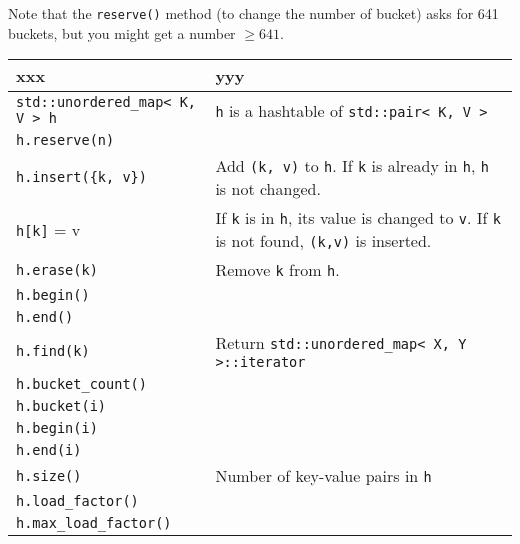 Note that the \verb!reserve()! method (to change the number of
bucket) asks for 641 buckets, but you might get a number $\geq 641$.






{\footnotesize
\begin{tabular}{|p{}|p{}|}
  \hline
  xxx  & yyy
  \\
  \hline \hline
  \texttt{std::unordered\_map< K, V > h} & \texttt{h} is a hashtable of \texttt{std::pair< K, V >} \\ \hline 
  \texttt{h.reserve(n)}                &                                                           \\ \hline 
  \texttt{h.insert(\{k, v\})}          & Add \texttt{(k, v)} to \texttt{h}. If \verb!k! is already in \verb!h!, \verb!h! is not changed. \\ \hline
  \texttt{h[k]} = v                    & If \verb!k! is in \verb!h!, its value is changed to \verb!v!. If \verb!k! is not found, \verb!(k,v)! is inserted. \\ \hline
  \texttt{h.erase(k)}                  & Remove \verb!k! from \verb!h!.                            \\ \hline
  \texttt{h.begin()}                   &                                                           \\ \hline
  \texttt{h.end()}                     &                                                           \\ \hline
  \texttt{h.find(k)}                   & Return \texttt{std::unordered\_map< X, Y >::iterator} \\ \hline
  \texttt{h.bucket\_count()}           &                                                           \\ \hline
  \texttt{h.bucket(i)}                 &                                                           \\ \hline
  \texttt{h.begin(i)}                  &                                                           \\ \hline

  \texttt{h.end(i)}                    &                                                           \\ \hline
  \texttt{h.size()}                    & Number of key-value pairs in \verb!h!                     \\ \hline
  \texttt{h.load\_factor()}            &                                                           \\ \hline
  \texttt{h.max\_load\_factor()}       &                                                           \\ \hline
\end{tabular}
}

